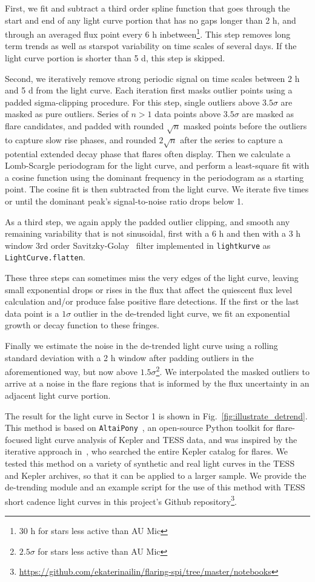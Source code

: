 \documentclass[fleqn,usenatbib]{mnras}%
\begin{document}
First, we fit and subtract a third order spline function that goes through the start and end of any light curve portion that has no gaps longer than 2 h, and through an averaged flux point every 6 h inbetween\footnote{30 h for stars less active than AU Mic}. This step removes long term trends as well as starspot variability on time scales of several days. If the light curve portion is shorter than 5 d, this step is skipped. 

Second, we iteratively remove strong periodic signal on time scales between 2 h and 5 d from the light curve. Each iteration first masks outlier points using a padded sigma-clipping procedure. For this step, single outliers above $3.5 \sigma$ are masked as pure outliers.  Series of $n>1$ data points above $3.5 \sigma$ are masked as flare candidates, and padded with rounded $\sqrt{n}$ masked points before the outliers to capture slow rise phases, and rounded $2\sqrt{n}$ after the series to capture a potential extended decay phase that flares often display. Then we calculate a Lomb-Scargle periodogram for the light curve, and perform a least-square fit with a cosine function using the dominant frequency in the periodogram as a starting point. The cosine fit is then subtracted from the light curve. We iterate five times or until the dominant peak's signal-to-noise ratio drops below 1. 

As a third step, we again apply the padded outlier clipping, and smooth any remaining variability that is not sinusoidal, first with a 6 h and then with a 3 h window 3rd order Savitzky-Golay~\citep{savitzky1964} filter implemented in \texttt{lightkurve} as \texttt{LightCurve.flatten}.

These three steps can sometimes miss the very edges of the light curve, leaving small exponential drops or rises in the flux that affect the quiescent flux level calculation and/or produce false positive flare detections. If the first or the last data point is a $1\sigma$ outlier in the de-trended light curve, we fit an exponential growth or decay function to these fringes.

Finally we estimate the noise in the de-trended light curve using a rolling standard deviation with a 2 h window after padding outliers in the aforementioned way, but now above $1.5 \sigma$\footnote{$2.5 \sigma$ for stars less active than AU Mic}. We interpolated the masked outliers to arrive at a noise in the flare regions that is informed by the flux uncertainty in an adjacent light curve portion.

The result for the light curve in Sector 1 is shown in Fig.~\ref{fig:illustrate_detrend}. This method is based on \texttt{AltaiPony}~\citep{ilin2021altaipony}, an open-source Python toolkit for flare-focused light curve analysis of Kepler and TESS data, and was inspired by the iterative approach in~\citet{davenport2016}, who searched the entire Kepler catalog for flares. We tested this method on a variety of synthetic and real light curves in the TESS and Kepler archives, so that it can be applied to a larger sample. We provide the de-trending module and an example script for the use of this method with TESS short cadence light curves in this project's Github repository\footnote{\url{https://github.com/ekaterinailin/flaring-spi/tree/master/notebooks}}.
\end{document}
